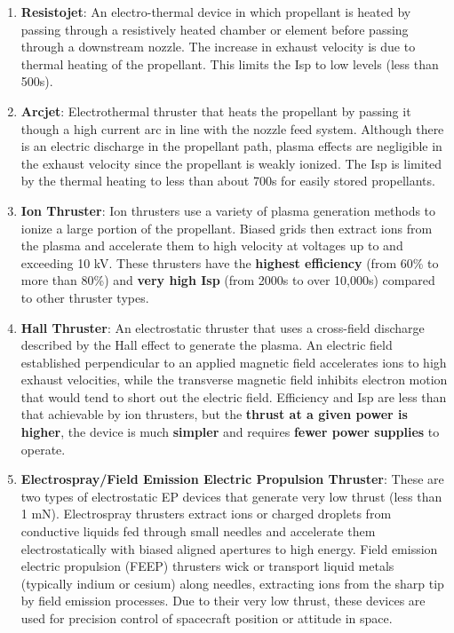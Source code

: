 \documentclass[11pt]{article}
\begin{document}
\begin{enumerate}
\item \textbf{Resistojet}: An electro-thermal device in which propellant is heated by passing through a resistively heated chamber or element before passing through a downstream nozzle. The increase in exhaust velocity is due to thermal heating of the propellant. This limits the Isp to low levels (less than 500s).

\item \textbf{Arcjet}: Electrothermal thruster that heats the propellant by passing it though a high current arc in line with the nozzle feed system. Although there is an electric discharge in the propellant path, plasma effects are negligible in the exhaust velocity since the propellant is weakly ionized. The Isp is limited by the thermal heating to less than about 700s for easily stored propellants.

\item \textbf{Ion Thruster}: Ion thrusters use a variety of plasma generation methods to ionize a large portion of the propellant. Biased grids then extract ions from the plasma and accelerate them to high velocity at voltages up to and exceeding 10 kV. These thrusters have the \textbf{highest efficiency} (from 60\% to  more than 80\%) and \textbf{very high Isp} (from 2000s to over 10,000s) compared to other thruster types.

\item \textbf{Hall Thruster}: An electrostatic thruster that uses a cross-field discharge described by the Hall effect to generate the plasma. An electric field established perpendicular to an applied magnetic field  accelerates ions to high exhaust velocities, while the transverse magnetic field inhibits electron motion that would tend to short out the electric field. Efficiency and Isp are less than that achievable by ion thrusters, but the \textbf{thrust at a given power is higher}, the device is much \textbf{simpler} and requires \textbf{fewer power supplies} to operate.

\item \textbf{Electrospray/Field Emission Electric Propulsion Thruster}: These are two types of electrostatic EP devices that generate very low thrust (less than 1 mN). Electrospray thrusters extract ions or charged droplets from conductive liquids fed through small needles and accelerate them electrostatically with biased aligned apertures to high energy. Field emission electric propulsion (FEEP) thrusters wick or transport liquid metals (typically indium or cesium) along needles, extracting ions from the sharp tip by field emission processes. Due to their very low thrust, these devices are used for precision control of spacecraft position or attitude in space.


\end{enumerate}
\end{document}
